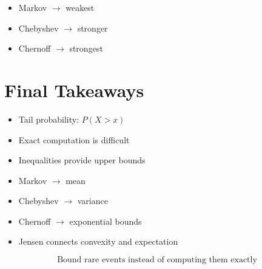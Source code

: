\documentclass[12pt]{article}
\begin{document}
\begin{itemize}
    \item Markov $\rightarrow$ weakest
    \item Chebyshev $\rightarrow$ stronger
    \item Chernoff $\rightarrow$ strongest
\end{itemize}

\section{Final Takeaways}

\begin{itemize}
    \item Tail probability: $P(X > x)$
    \item Exact computation is difficult
    \item Inequalities provide upper bounds
    \item Markov $\rightarrow$ mean
    \item Chebyshev $\rightarrow$ variance
    \item Chernoff $\rightarrow$ exponential bounds
    \item Jensen connects convexity and expectation
\end{itemize}

\[
\text{Bound rare events instead of computing them exactly}
\]
\end{document}
